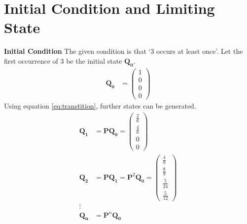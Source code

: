 \documentclass[journal,12pt,two column]{IEEEtran}
\theoremstyle{remark}
\newcommand{\myvec}[1]{\ensuremath{\begin{pmatrix}#1\end{pmatrix}}}
\let\vec\mathbf
\begin{document}
\section{Initial Condition and Limiting State}
\textbf{Initial Condition}
     The given condition is that \lq3 occurs at least once\rq. Let the first occurrence of 3 be the initial state $ \vec{Q_0}$.
    \begin{align}
        \vec{Q_0} &= \myvec{ 1 \\ 0 \\ 0 \\ 0 } 
    \end{align}
    Using equation \eqref{eq:transtition}, further states can be generated.
    \begin{align}
        \vec{Q_1} &= \vec{P} \vec{Q_{0}}
            = \myvec{\frac{2}{6} \\[4pt] \frac{4}{6}  \\[4pt] 0 \\ 0}\\
        \vec{Q_2} &= \vec{P} \vec{Q_1} = \vec{P}^{2} \vec{Q_0} 
            = \myvec{\frac{4}{9}  \\[4pt] \frac{8}{9}  \\[4pt] \frac{5}{24}\\[4pt] \frac{5}{12}} \\   
        \vdots \\
        \vec{Q_n} &= \vec{P}^{n} \vec{Q_0}
    \end{align}
\end{document}
